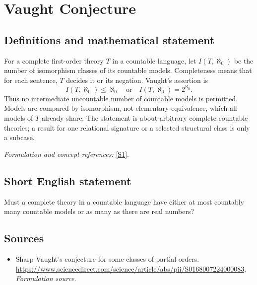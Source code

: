 \documentclass[11pt]{article}
\begin{document}
\section*{\texorpdfstring{Vaught Conjecture}{Vaught Conjecture}}\label{1343}
\subsection{Definitions and mathematical statement}
For a complete first-order theory $T$ in a countable language, let $I(T,\aleph_0)$ be the number of isomorphism classes of its countable models. Completeness means that for each sentence, $T$ decides it or its negation. Vaught's assertion is
\[
 I(T,\aleph_0)\le\aleph_0\quad\text{or}\quad I(T,\aleph_0)=2^{\aleph_0}.
\]
Thus no intermediate uncountable number of countable models is permitted. Models are compared by isomorphism, not elementary equivalence, which all models of $T$ already share. The statement is about arbitrary complete countable theories; a result for one relational signature or a selected structural class is only a subcase.
\par\smallskip\textit{Formulation and concept references:} \href{https://www.sciencedirect.com/science/article/abs/pii/S0168007224000083}{[S1]}.

\subsection{Short English statement}
Must a complete theory in a countable language have either at most countably many countable models or as many as there are real numbers?
\subsection{Sources}
\begin{itemize}
\item[S1]Sharp Vaught's conjecture for some classes of partial orders.
\url{https://www.sciencedirect.com/science/article/abs/pii/S0168007224000083}.
\textit{Formulation source.}
\end{itemize}
\end{document}
